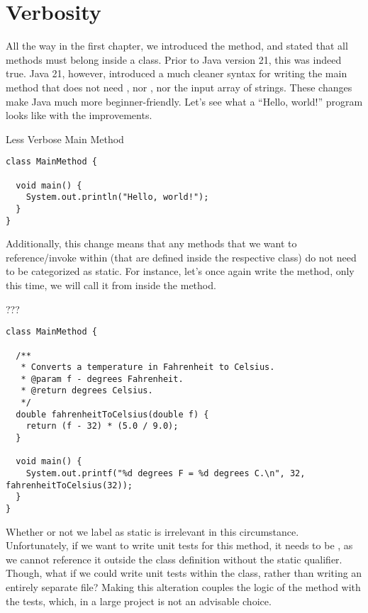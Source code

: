 \section{Verbosity}

All the way in the first chapter, we introduced the  method, and stated that all methods must belong inside a class. Prior to Java version 21, this was indeed true. Java 21, however, introduced a much cleaner syntax for writing the main method that does not need , nor , nor the input array of strings. These changes make Java much more beginner-friendly. Let's see what a ``Hello, world!'' program looks like with the improvements.

\begin{cl}[]{Less Verbose Main Method}
\begin{lstlisting}[language=MyJava]
class MainMethod {

  void main() {
    System.out.println("Hello, world!");
  }
}
\end{lstlisting}
\end{cl}

Additionally, this change means that any methods that we want to reference/invoke within  (that are defined inside the respective class) do not need to be categorized as static. For instance, let's once again write the  method, only this time, we will call it from inside the  method.

\begin{cl}[]{???}
\begin{lstlisting}[language=MyJava]
class MainMethod {

  /**
   * Converts a temperature in Fahrenheit to Celsius.
   * @param f - degrees Fahrenheit.
   * @return degrees Celsius.
   */
  double fahrenheitToCelsius(double f) {
    return (f - 32) * (5.0 / 9.0);
  }
  
  void main() {
    System.out.printf("%d degrees F = %d degrees C.\n", 32, fahrenheitToCelsius(32));
  }
}
\end{lstlisting}
\end{cl}

Whether or not we label  as static is irrelevant in this circumstance. Unfortunately, if we want to write unit tests for this method, it needs to be , as we cannot reference it outside the class definition without the static qualifier. Though, what if we could write unit tests within the  class, rather than writing an entirely separate file? Making this alteration couples the logic of the method with the tests, which, in a large project is not an advisable choice. 

